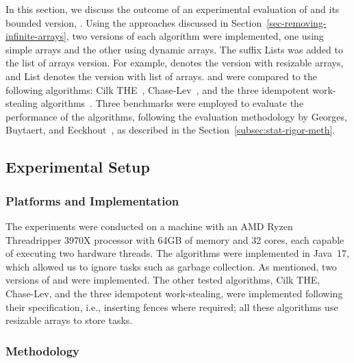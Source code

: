 
In this section, we discuss the outcome of an experimental evaluation of \NCWSM and its bounded version, \BNCWSM.  Using the approaches discussed in Section~\ref{sec-removing-infinite-arrays}, two versions of each algorithm were implemented, one using simple arrays and the other using dynamic arrays. The suffix Lists was added to the list of arrays version. For example, \NCWSM denotes the version with resizable arrays, and \NCWSM List denotes the version with list of arrays.  \NCWSM and \BNCWSM were compared to the following algorithms: Cilk THE~\cite{DBLP_conf_pldi_FrigoLR98}, Chase-Lev~\cite{circular.work.stealing}, and the three idempotent work-stealing algorithms~\cite{maged.vechev.2009}.  Three benchmarks were employed to evaluate the performance of the algorithms, following the evaluation methodology by Georges, Buytaert, and Eeckhout~\cite{DBLP_conf_oopsla_GeorgesBE07}, as described in the Section~\ref{subsec:stat-rigor-meth}.

\subsection{\label{subsec-experimental-setup}Experimental Setup}

\subsubsection{\label{subsec:implementation}Platforms and Implementation}

The experiments were conducted on a machine with an AMD Ryzen Threadripper 3970X processor with 64GB of memory and 32 cores, each capable of executing two hardware threads. The algorithms were implemented in Java~17, which allowed us to ignore tasks such as garbage collection.  As mentioned, two versions of \NCWSM and \BNCWSM were implemented. The other tested algorithms, Cilk THE, Chase-Lev, and the three idempotent work-stealing, were implemented following their specification, i.e., inserting fences where required; all these algorithms use resizable arrays to store tasks.

\subsubsection{\label{subsec:methodology}Methodology}

